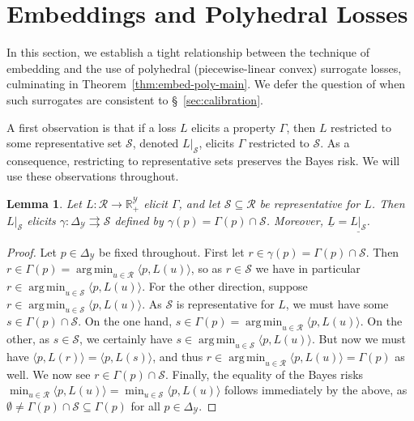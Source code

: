 \documentclass[11pt]{article}
\newcommand{\reals}{\mathbb{R}}
\newcommand{\simplex}{\Delta_\Y}
\newcommand{\R}{\mathcal{R}}
\newcommand{\Sc}{\mathcal{S}}
\newcommand{\Y}{\mathcal{Y}}
\newcommand{\risk}[1]{\underline{#1}}
\newcommand{\inprod}[2]{\langle #1, #2 \rangle}%
\newcommand{\toto}{\rightrightarrows}
\DeclareMathOperator*{\argmin}{arg\,min}
\newtheorem{lemma}{Lemma}
\begin{document}
\section{Embeddings and Polyhedral Losses}
\label{sec:poly-loss-embed}

In this section, we establish a tight relationship between the technique of embedding and the use of polyhedral (piecewise-linear convex) surrogate losses, culminating in Theorem~\ref{thm:embed-poly-main}.
We defer the question of when such surrogates are consistent to \S~\ref{sec:calibration}. 

A first observation is that if a loss $L$ elicits a property $\Gamma$, then $L$ restricted to some representative set $\Sc$, denoted $L|_\Sc$, elicits $\Gamma$ restricted to $\Sc$.
As a consequence, restricting to representative sets preserves the Bayes risk.
We will use these observations throughout.
\begin{lemma}\label{lem:loss-restrict}
  Let $L:\R\to\reals^\Y_+$ elicit $\Gamma$, and let $\Sc\subseteq\R$ be representative for $L$.
  Then $L|_\Sc$ elicits $\gamma:\simplex\toto\Sc$ defined by $\gamma(p) = \Gamma(p)\cap \Sc$.
  Moreover, $\risk{L}=\risk{L|_\Sc}$.
\end{lemma}
\begin{proof}
  Let $p\in\simplex$ be fixed throughout.
  First let $r \in \gamma(p) = \Gamma(p) \cap \Sc$.
  Then $r \in \Gamma(p) = \argmin_{u\in\R} \inprod{p}{L(u)}$, so as $r\in\Sc$ we have in particular $r \in \argmin_{u\in\Sc} \inprod{p}{L(u)}$.
  For the other direction, suppose $r \in \argmin_{u\in\Sc} \inprod{p}{L(u)}$.
  As $\Sc$ is representative for $L$, we must have some $s \in \Gamma(p) \cap \Sc$.
  On the one hand, $s\in\Gamma(p) = \argmin_{u\in\R} \inprod{p}{L(u)}$.
  On the other, as $s \in \Sc$, we certainly have $s \in \argmin_{u\in\Sc} \inprod{p}{L(u)}$.
  But now we must have $\inprod{p}{L(r)} = \inprod{p}{L(s)}$, and thus $r \in \argmin_{u\in\R} \inprod{p}{L(u)} = \Gamma(p)$ as well.
  We now see $r \in \Gamma(p) \cap \Sc$.
  Finally, the equality of the Bayes risks $\min_{u\in\R} \inprod{p}{L(u)} = \min_{u\in\Sc} \inprod{p}{L(u)}$ follows immediately by the above, as $\emptyset \neq \Gamma(p)\cap\Sc \subseteq \Gamma(p)$ for all $p\in\simplex$.
\end{proof}
\end{document}
